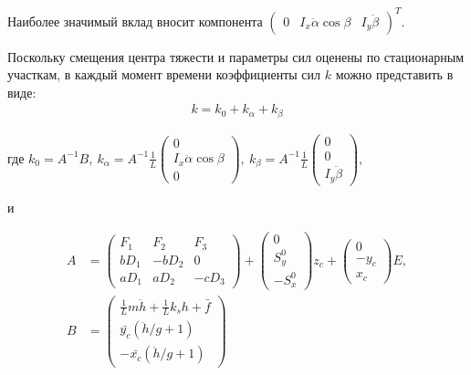 Наиболее значимый вклад вносит компонента $\begin{pmatrix}0 & I_x\ddot{\alpha}\cos{\beta} & I_y \ddot{\beta} \end{pmatrix}^T$.

Поскольку смещения центра тяжести и параметры сил оценены по стационарным участкам, в каждый момент времени коэффициенты сил $k$ можно представить в виде:
\begin{equation}
\begin{aligned}
	k = k_0 + k_{\alpha} + k_{\beta}
\end{aligned}
\end{equation}

где
$k_0 = A^{-1}B,~k_{\alpha}=A^{-1}\frac{1}{L}\begin{pmatrix}0 \\ I_x\ddot{\alpha}\cos{\beta} \\ 0\end{pmatrix},~k_{\beta}=A^{-1}\frac{1}{L}\begin{pmatrix}0 \\ 0 \\ I_y\ddot{\beta}\end{pmatrix},~$

и

\begin{equation}
\begin{aligned}
	A & = \begin{pmatrix}F_1 & F_2 & F_3 \\ bD_1 & -bD_2 & 0 \\ aD_1 & aD_2 & -cD_3\end{pmatrix}+
	\begin{pmatrix}0 \\ S_y^0 \\ -S_x^0\end{pmatrix}z_c + \begin{pmatrix}0 \\ -y_c \\ x_c\end{pmatrix}E, \\
	B &= \begin{pmatrix}
	\frac{1}{L}m\ddot{h} + \frac{1}{L}k_sh + \bar{f}\\
	\bar{y_c}\left(\ddot{h}/g + 1\right) \\
	-\bar{x_c}\left(\ddot{h}/g + 1\right)
	\end{pmatrix}
\end{aligned}
\end{equation}


